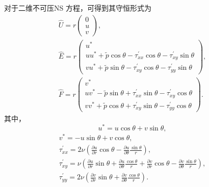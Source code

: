 \documentclass[12pt]{article}
\begin{document}
对于二维不可压NS 方程，可得到其守恒形式为
\begin{gather}
	\hat{U}=r \begin{pmatrix}
		0 \\
		u \\
		v
	\end{pmatrix}, \\
	\hat{E}=r \begin{pmatrix}
		u^{*}                                                                                         \\
		u u^{*}+\tilde{p} \cos \theta-\tau_{x x}^{\prime} \cos \theta-\tau_{x y}^{\prime} \sin \theta \\
		v u^{*}+\tilde{p} \sin \theta-\tau_{x y}^{\prime} \cos \theta-\tau_{y y}^{\prime} \sin \theta
	\end{pmatrix},\\
	\hat{F}= r \begin{pmatrix}
		v^{*}                                                                                         \\
		u v^{*}-\tilde{p} \sin \theta+\tau_{x x}^{\prime} \sin \theta-\tau_{x y}^{\prime} \cos \theta \\
		v v^{*}+\tilde{p} \cos \theta+\tau_{x y}^{\prime} \sin \theta-\tau_{y y}^{\prime} \cos \theta
	\end{pmatrix}.
\end{gather}
其中，
\begin{equation}
	u^{*}=u \cos \theta+v \sin \theta,
\end{equation}
\begin{gather}
	v^{*}=-u \sin \theta+v \cos \theta,                                                                                                                                                                                                        \\
	\tau_{x x}^{\prime}=2 \nu\left(\frac{\partial u}{\partial r} \cos \theta-\frac{\partial u}{\partial \theta} \frac{\sin \theta}{r}\right),                                                                                                \\
	\tau_{x y}^{\prime}=\nu\left(\frac{\partial u}{\partial r} \sin \theta+\frac{\partial u}{\partial \theta} \frac{\cos \theta}{r}+\frac{\partial v}{\partial r} \cos \theta-\frac{\partial v}{\partial \theta} \frac{\sin \theta}{r}\right), \\
	\tau_{y y}^{\prime}=2 \nu\left(\frac{\partial v}{\partial r} \sin \theta+\frac{\partial v}{\partial \theta} \frac{\cos \theta}{r}\right).
\end{gather}
\end{document}
